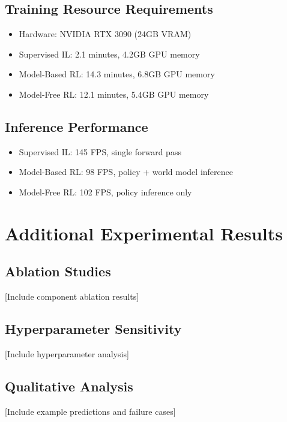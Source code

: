 \documentclass{article}
\begin{document}
\subsection{Training Resource Requirements}
\begin{itemize}
\item Hardware: NVIDIA RTX 3090 (24GB VRAM)
\item Supervised IL: 2.1 minutes, 4.2GB GPU memory
\item Model-Based RL: 14.3 minutes, 6.8GB GPU memory  
\item Model-Free RL: 12.1 minutes, 5.4GB GPU memory
\end{itemize}

\subsection{Inference Performance}
\begin{itemize}
\item Supervised IL: 145 FPS, single forward pass
\item Model-Based RL: 98 FPS, policy + world model inference
\item Model-Free RL: 102 FPS, policy inference only
\end{itemize}

\section{Additional Experimental Results}

\subsection{Ablation Studies}
[Include component ablation results]

\subsection{Hyperparameter Sensitivity}
[Include hyperparameter analysis]

\subsection{Qualitative Analysis}
[Include example predictions and failure cases]
\end{document}
